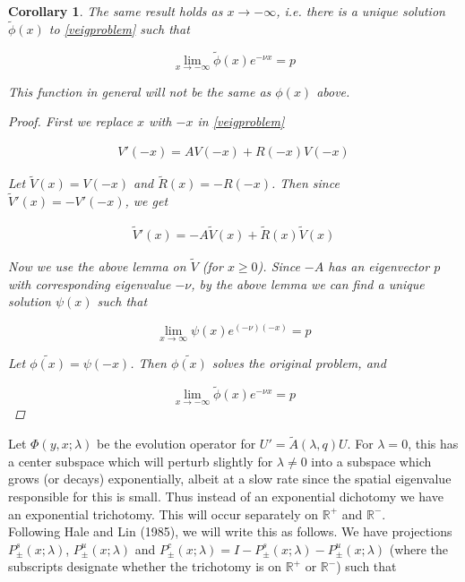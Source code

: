 \documentclass[12pt]{article}
\def\R{{\mathbb R}}
\newtheorem{corollary}{Corollary}
\begin{document}
\begin{corollary}The same result holds as $x \rightarrow -\infty$, i.e. there is a unique solution $\tilde{\phi}(x)$ to \eqref{veigproblem} such that 

\[
\lim_{x\rightarrow -\infty} \tilde{\phi}(x) e^{-\nu x} = p
\]

This function in general will not be the same as $\phi(x)$ above.

\begin{proof}
First we replace $x$ with $-x$ in \eqref{veigproblem}

\begin{align*}
V'(-x) = A V(-x) + R(-x)V(-x)
\end{align*}

Let $\tilde{V}(x) = V(-x)$ and $\tilde{R}(x) = -R(-x)$. Then since $\tilde{V}'(x) = -V'(-x)$, we get

\begin{align*}
\tilde{V}'(x) = -A \tilde{V}(x) + \tilde{R}(x)\tilde{V}(x)
\end{align*}

Now we use the above lemma on $\tilde{V}$ (for $x \geq 0$). Since $-A$ has an eigenvector $p$ with corresponding eigenvalue $-\nu$, by the above lemma we can find a unique solution $\psi(x)$ such that 

\[
\lim_{x\rightarrow \infty} \psi(x) e^{(-\nu)(-x)} = p
\]

Let $\tilde{\phi(x)} = \psi(-x)$. Then $\tilde{\phi(x)}$ solves the original problem, and

\[
\lim_{x\rightarrow -\infty} \tilde{\phi}(x) e^{-\nu x } = p
\]


\end{proof}
\end{corollary}


Let $\Phi(y,x; \lambda)$ be the evolution operator for $U' = \tilde{A}(\lambda, q) U$. For $\lambda = 0$, this has a center subspace which will perturb slightly for $\lambda \neq 0$ into a subspace which grows (or decays) exponentially, albeit at a slow rate since the spatial eigenvalue responsible for this is small. Thus instead of an exponential dichotomy we have an exponential trichotomy. This will occur separately on $\R^+$ and $\R^-$.\\

Following Hale and Lin (1985), we will write this as follows. We have projections $P^s_\pm(x; \lambda)$, $P^u_\pm(x; \lambda)$ and $P^c_\pm(x; \lambda) = I - P^s_\pm(x; \lambda) - P^u_\pm(x; \lambda)$ (where the subscripts designate whether the trichotomy is on $\R^+$ or $\R^-$) such that
\end{document}
